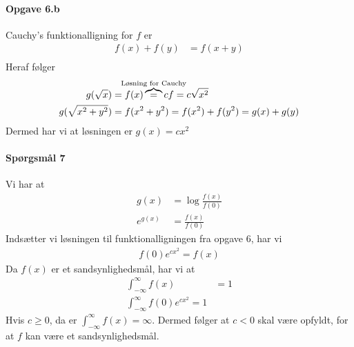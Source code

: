 \documentclass{article} %
\begin{document}
\paragraph*{Opgave 6.b}
Cauchy's funktionalligning for \(f\) er
\begin{align}
    f(x)+f(y) & = f(x+y)\\
\end{align}
Heraf følger
\begin{align}
    g(\sqrt{x})       & = f(x)\overbrace{=}^{\text{\makebox[0pt]{Løsning for Cauchy}}} cf =c\sqrt{x^2} \\
    g(\sqrt{x^2+y^2}) & = f(x^2+y^2) = f(x^2)+f(y^2) = g(x)+g(y)
\end{align}
Dermed har vi at løsningen er \(g(x)=cx^2\)
\paragraph*{Spørgsmål 7}
Vi har at
\begin{align}
    g(x)     & = \log{\frac{f(x)}{f(0)}} \\
    e^{g(x)} & = \frac{f(x)}{f(0)}
\end{align}
Indsætter vi løsningen til funktionalligningen fra opgave 6, har vi
\begin{align}
    f(0)e^{cx^2}=f(x) \label{eq:47}
\end{align}
 Da \(f(x)\) er et sandsynlighedsmål, har vi at
 \begin{align}
     \int_{-\infty}^\infty f(x) & = 1 \\
     \int_{-\infty}^\infty f(0)e^{cx^2} = 1
 \end{align}
 Hvis \(c\geq0\), da er \(\int_{-\infty}^\infty f(x)=\infty\). Dermed følger at \(c<0\) skal være opfyldt, for at \(f\) kan være et sandsynlighedsmål.
\end{document}
